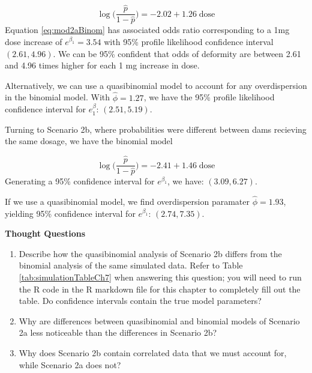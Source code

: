 \documentclass[
]{krantz}
\begin{document}
\begin{equation}
  \log\bigg( \frac{\hat{p}}{1-\hat{p}} \bigg) = -2.02 + 1.26\;\textrm{dose}
  \label{eq:mod2aBinom}
\end{equation}
Equation \eqref{eq:mod2aBinom} has associated odds ratio corresponding to a 1mg dose increase of \(e^{\beta_1} = 3.54\) with 95\% profile likelihood confidence interval \((2.61, 4.96)\). We can be 95\% confident that odds of deformity are between 2.61 and 4.96 times higher for each 1 mg increase in dose.

Alternatively, we can use a quasibinomial model to account for any overdispersion in the binomial model. With \(\widehat{\phi} = 1.27\), we have the 95\% profile likelihood confidence interval for \(e^\beta_1\): \((2.51, 5.19)\).

Turning to Scenario 2b, where probabilities were different between dams recieving the same dosage, we have the binomial model

\begin{equation*}
  \log\bigg( \frac{\hat{p}}{1-\hat{p}} \bigg) = -2.41 + 1.46\;\textrm{dose}
\end{equation*}
Generating a 95\% confidence interval for \(e^{\beta_1}\), we have: \((3.09, 6.27)\).

If we use a quasibinomial model, we find overdispersion paramater \(\widehat{\phi} = 1.93\), yielding 95\% confidence interval for \(e^{\beta_1}\): \((2.74, 7.35)\).

\vspace{5mm}

\textbf{Thought Questions}

\begin{enumerate}
\def\labelenumi{\arabic{enumi}.}
\setcounter{enumi}{8}
\item
  Describe how the quasibinomial analysis of Scenario 2b differs from the binomial analysis of the same simulated data. Refer to Table \ref{tab:simulationTableCh7} when answering this question; you will need to run the R code in the R markdown file for this chapter to completely fill out the table. Do confidence intervals contain the true model parameters?
\item
  Why are differences between quasibinomial and binomial models of Scenario 2a less noticeable than the differences in Scenario 2b?
\item
  Why does Scenario 2b contain correlated data that we must account for, while Scenario 2a does not?
\end{enumerate}
\end{document}
